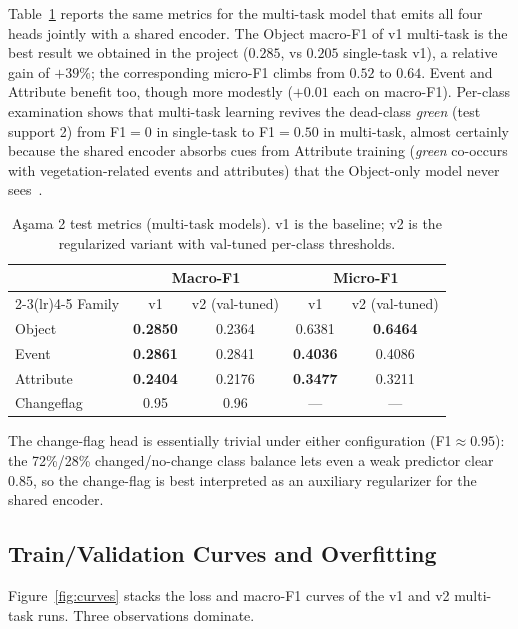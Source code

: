 \documentclass[journal]{IEEEtran}
\begin{document}
Table~\ref{tab:multi-task} reports the same metrics for the multi-task model that emits all four heads jointly with a shared encoder. The Object macro-F1 of v1 multi-task is the best result we obtained in the project ($0.285$, vs $0.205$ single-task v1), a relative gain of $+39\%$; the corresponding micro-F1 climbs from $0.52$ to $0.64$. Event and Attribute benefit too, though more modestly ($+0.01$ each on macro-F1). Per-class examination shows that multi-task learning revives the dead-class \emph{green} (test support 2) from F1$=0$ in single-task to F1$=0.50$ in multi-task, almost certainly because the shared encoder absorbs cues from Attribute training (\emph{green} co-occurs with vegetation-related events and attributes) that the Object-only model never sees~\cite{caruana1997multitask}.

\begin{table}[!t]
\caption{A\c{s}ama 2 test metrics (multi-task models). v1 is the baseline; v2 is the regularized variant with val-tuned per-class thresholds.}
\label{tab:multi-task}
\centering
\small
\begin{tabular}{@{}lcccc@{}}
\toprule
 & \multicolumn{2}{c}{Macro-F1} & \multicolumn{2}{c}{Micro-F1} \\
\cmidrule(lr){2-3}\cmidrule(lr){4-5}
Family & v1 & v2 (val-tuned) & v1 & v2 (val-tuned) \\
\midrule
Object     & \textbf{0.2850} & 0.2364 & 0.6381 & \textbf{0.6464} \\
Event      & \textbf{0.2861} & 0.2841 & \textbf{0.4036} & 0.4086 \\
Attribute  & \textbf{0.2404} & 0.2176 & \textbf{0.3477} & 0.3211 \\
Changeflag & 0.95 & 0.96 & --- & --- \\
\bottomrule
\end{tabular}
\end{table}

The change-flag head is essentially trivial under either configuration (F1$\approx 0.95$): the 72\%/28\% changed/no-change class balance lets even a weak predictor clear $0.85$, so the change-flag is best interpreted as an auxiliary regularizer for the shared encoder.

\subsection{Train/Validation Curves and Overfitting}\label{ssec:overfit}

Figure~\ref{fig:curves} stacks the loss and macro-F1 curves of the v1 and v2 multi-task runs. Three observations dominate.
\end{document}
